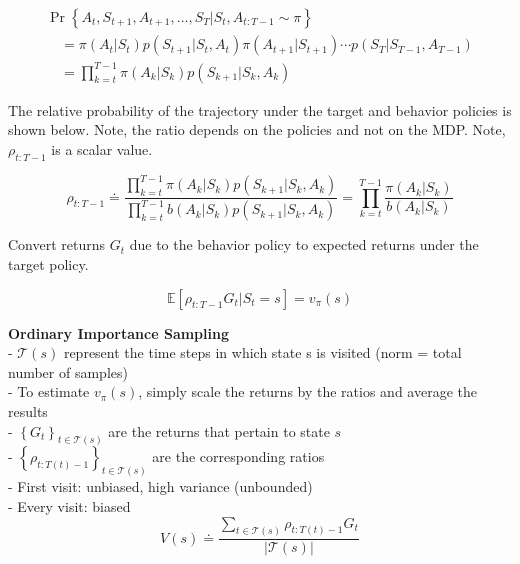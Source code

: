 \documentclass{article}
\begin{document}
\begin{equation}
\begin{array}{l}
\operatorname{Pr}\left\{A_{t}, S_{t+1}, A_{t+1}, \ldots, S_{T} | S_{t}, A_{t: T-1} \sim \pi\right\} \\
\quad=\pi\left(A_{t} | S_{t}\right) p\left(S_{t+1} | S_{t}, A_{t}\right) \pi\left(A_{t+1} | S_{t+1}\right) \cdots p\left(S_{T} | S_{T-1}, A_{T-1}\right) \\
\quad=\prod_{k=t}^{T-1} \pi\left(A_{k} | S_{k}\right) p\left(S_{k+1} | S_{k}, A_{k}\right)
\end{array}
\end{equation}

\newpage
\noindent
The relative probability of the trajectory under the target and behavior
policies is shown below. Note, the ratio depends on the policies and not on the
MDP. Note, $\rho_{t: T-1}$ is a scalar value.

\begin{equation}
\rho_{t: T-1} \doteq \frac{\prod_{k=t}^{T-1} \pi\left(A_{k} | S_{k}\right) p\left(S_{k+1} | S_{k}, A_{k}\right)}{\prod_{k=t}^{T-1} b\left(A_{k} | S_{k}\right) p\left(S_{k+1} | S_{k}, A_{k}\right)}=\prod_{k=t}^{T-1} \frac{\pi\left(A_{k} | S_{k}\right)}{b\left(A_{k} | S_{k}\right)}
\end{equation}

\noindent
Convert returns $G_{t}$ due to the behavior policy to expected returns under the
target policy.

\begin{equation}
\mathbb{E}\left[\rho_{t: T-1} G_{t} | S_{t}=s\right]=v_{\pi}(s)
\end{equation}

\noindent
\textbf{Ordinary Importance Sampling}\\
- $\mathcal{T}(s)$ represent the time steps in which state s is visited (norm =
total number of samples)\\
- To estimate $v_{\pi}(s)$, simply scale the returns by the ratios and average
the results\\
- $\left\{G_{t}\right\}_{t \in \mathcal{T}(s)}$ are the returns that pertain to
state $s$ \\
- $\left\{\rho_{t: T(t)-1}\right\}_{t \in \mathcal{T}(s)}$ are the corresponding
ratios\\
- First visit: unbiased, high variance (unbounded)\\
- Every visit: biased
\begin{equation}
V(s) \doteq \frac{\sum_{t \in \mathcal{T}(s)} \rho_{t: T(t)-1} G_{t}}{|\mathcal{T}(s)|}
\end{equation}
\end{document}
